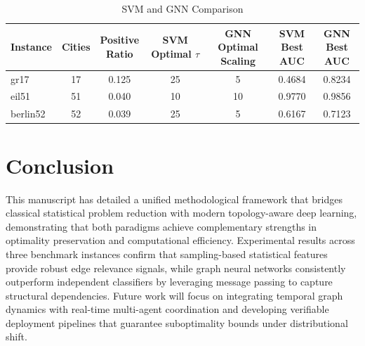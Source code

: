 \documentclass[10pt,twoside]{article}
\numberwithin{equation}{section}
\begin{document}
	\begin{table}[htbp]


		\centering


		\caption{SVM and GNN Comparison}


		\label{tab:svm_vs_gnn_comparison}


		\begin{tabular}{l|cccccc}\hline


			Instance & Cities & \makecell{Positive \\ Ratio} & \makecell{SVM \\ Optimal $\tau$} & \makecell{GNN \\ Optimal Scaling} & \makecell{SVM \\ Best AUC} & \makecell{GNN \\ Best AUC} \\ \hline


			gr17     & 17  & 0.125 & 25 & 5  & 0.4684 & 0.8234 \\


			eil51    & 51  & 0.040 & 10 & 10 & 0.9770 & 0.9856 \\


			berlin52 & 52  & 0.039 & 25 & 5  & 0.6167 & 0.7123 \\ \hline


		\end{tabular}


	\end{table}


	


	


	\section{Conclusion}


	 This manuscript has detailed a unified methodological framework that bridges classical statistical problem reduction with modern topology-aware deep learning, demonstrating that both paradigms achieve complementary strengths in optimality preservation and computational efficiency. Experimental results across three benchmark instances confirm that sampling-based statistical features provide robust edge relevance signals, while graph neural networks consistently outperform independent classifiers by leveraging message passing to capture structural dependencies. Future work will focus on integrating temporal graph dynamics with real-time multi-agent coordination and developing verifiable deployment pipelines that guarantee suboptimality bounds under distributional shift.
\end{document}

